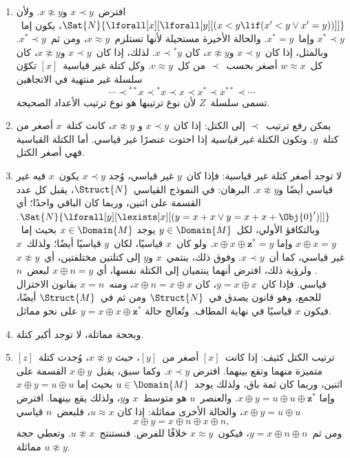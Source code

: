 \documentclass[../../../include/open-logic-section]{subfiles}
\begin{document}
\begin{enumerate}
  $x \approx y$ إذا وفقط إذا كان، لبعض~$n$ \emph{قياسي}، إما
  $x \oplus n = y$ وإما~$y \oplus n =x$. وبعبارة أخرى، يكون
  $x \approx y$ إذا وفقط إذا كانت المسافة بين~$x$ و$y$ منتهية. وإذا
  كان~$n$ و$m$ قياسيين، كان~$n \approx m$. وعرّف~\emph{كتلة}~$x$
  بأنها صنف التكافؤ~$[x] = \Setabs{y}{x \approx y}$.
\item افترض~$x \prec y$ و$x \not\approx y$. ولأن
  $\Sat{N}{\lforall[x][\lforall[y][(x < y \lif (x' < y \lor x' =
      y))]]}$، يكون إما~$x^* \prec y$ وإما~$x^* = y$. والحالة
  الأخيرة مستحيلة لأنها تستلزم~$x \approx y$، ومن ثم~$x^* \prec y$.
  وبالمثل، إذا كان~$x \prec y$ و$x \not\approx y$، كان
  $x \prec {^*y}$. لذلك، إذا كان~$x \prec y$ و$x \not\approx y$،
  كان كل~$w \approx x$ أصغر بحسب~$\prec$ من كل~$v \approx y$.
  وكل كتلة غير قياسية~$[x]$ تكوّن سلسلة غير منتهية في الاتجاهين
  \[
  \cdots \prec {^{**}x} \prec {^*}x \prec x \prec x^* \prec x^{**}
  \prec \cdots
  \]
  تسمى سلسلة~$Z$ لأن نوع ترتيبها هو نوع ترتيب الأعداد الصحيحة.
\item يمكن رفع ترتيب~$\prec$ إلى الكتل: إذا كان~$x \prec y$ و
  $x \not\approx y$، كانت كتلة~$x$ أصغر من كتلة~$y$. وتكون الكتلة
  \emph{غير قياسية} إذا احتوت عنصرًا غير قياسي. أما الكتلة القياسية
  فهي أصغر الكتل.
\item لا توجد أصغر كتلة غير قياسية: فإذا كان~$y$ غير قياسي، وُجد
  $x \prec y$ يكون~$x$ فيه غير قياسي أيضًا و$x \not\approx y$.
  البرهان: في النموذج القياسي~$\Struct{N}$، يقبل كل عدد القسمة على
  اثنين، وربما كان الباقي واحدًا؛ أي
  $\Sat{N}{\lforall[y][\lexists[x][(y = x + x \lor y = x + x +
        \Obj{0}')]]}$. وبالتكافؤ الأولي، لكل~$y \in \Domain{M}$ يوجد
  $x \in \Domain{M}$ بحيث إما~$x \oplus x = y$ وإما
  $x \oplus x \oplus \mathbf{z}^*= y$. ولو كان~$x$ قياسيًا، لكان~$y$
  قياسيًا أيضًا؛ ولذلك~$x$ غير قياسي، كما أن~$x \prec y$. وفوق ذلك،
  ينتمي~$x$ و$y$ إلى كتلتين مختلفتين، أي~$x \not\approx y$. ولرؤية
  ذلك، افترض أنهما ينتميان إلى الكتلة نفسها، أي
  $x \oplus n = y$ لبعض~$n$ قياسي. فإذا كان~$y = x \oplus x$، كان
  $x \oplus n = x \oplus x$، ومنه~$x = n$ بقانون الاختزال للجمع،
  وهو قانون يصدق في~$\Struct{N}$ ومن ثم في~$\Struct{M}$ أيضًا، فيكون
  $x$ قياسيًا في نهاية المطاف. وتُعالج حالة
  $y = x \oplus x \oplus \mathbf{z}^*$ على نحو مماثل.
\item وبحجة مماثلة، لا توجد أكبر كتلة.
\item ترتيب الكتل كثيف: إذا كانت~$[x]$ أصغر من~$[y]$، حيث
  $x \not\approx y$، وُجدت كتلة~$[z]$ متميزة منهما وتقع بينهما. افترض
  $x \prec y$. وكما سبق، يقبل~$x \oplus y$ القسمة على اثنين، وربما
  كان ثمة باق، ولذلك يوجد~$u \in \Domain{M}$ بحيث إما
  $x \oplus y = u \oplus u$ وإما
  $x \oplus y = u \oplus u \oplus \mathbf{z}^*$. والعنصر~$u$ هو
  متوسط~$x$ و$y$، ولذلك يقع بينهما. افترض
  $x \oplus y = u \oplus u$، والحالة الأخرى مماثلة: إذا كان
  $u \approx x$، فلبعض~$n$ قياسي
  \[
  x \oplus y = x \oplus n \oplus x \oplus n,
  \]
  ومن ثم~$y = x \oplus n \oplus n$، فيكون~$x \approx y$ خلافًا
  للفرض. فنستنتج~$u \not\approx x$. وتعطي حجة مماثلة
  $u \not\approx y$.
\end{enumerate}
\end{document}
